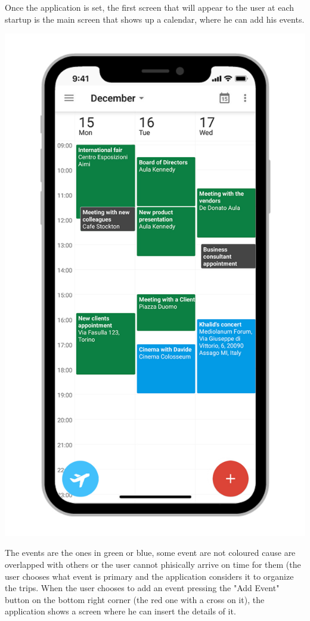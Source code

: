 Once the application is set, the first screen that will appear to the user at each startup is the main screen that shows up a calendar, where he can add his events.
\begin{center}
\includegraphics[scale=1.2]{MainMatter/images/ui/calendar}
\end{center}
The events are the ones in green or blue, some event are not coloured cause are overlapped with others or the user cannot phisically arrive on time for them (the user chooses what event is primary and the application considers it to organize the trips. When the user chooses to add an event pressing the "Add Event" button on the bottom right corner (the red one with a cross on it), the application shows a screen where he can insert the details of it.
